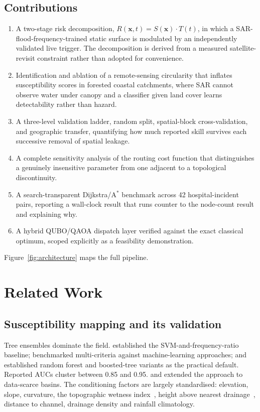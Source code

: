 \documentclass[journal]{IEEEtran}
\newcommand{\Sx}{S(\mathbf{x})}
\newcommand{\Tt}{T(t)}
\newcommand{\Rxt}{R(\mathbf{x},t)}
\begin{document}
\subsection{Contributions}
\begin{enumerate}
\itemsep2pt
\item A two-stage risk decomposition, $\Rxt=\Sx\cdot\Tt$, in which a
      SAR-flood-frequency-trained static surface is modulated by an independently
      validated live trigger. The decomposition is derived from a measured
      satellite-revisit constraint rather than adopted for convenience.
\item Identification and ablation of a remote-sensing circularity that inflates
      susceptibility scores in forested coastal catchments, where SAR cannot
      observe water under canopy and a classifier given land cover learns
      detectability rather than hazard.
\item A three-level validation ladder, random split, spatial-block
      cross-validation, and geographic transfer, quantifying how much reported
      skill survives each successive removal of spatial leakage.
\item A complete sensitivity analysis of the routing cost function that
      distinguishes a genuinely insensitive parameter from one adjacent to a
      topological discontinuity.
\item A search-transparent Dijkstra/A$^\ast$ benchmark across 42
      hospital-incident pairs, reporting a wall-clock result that runs counter to
      the node-count result and explaining why.
\item A hybrid QUBO/QAOA dispatch layer verified against the exact classical
      optimum, scoped explicitly as a feasibility demonstration.
\end{enumerate}

Figure~\ref{fig:architecture} maps the full pipeline.

\section{Related Work}
\label{sec:related}

\subsection{Susceptibility mapping and its validation}
Tree ensembles dominate the field. \citet{tehrany2014} established the
SVM-and-frequency-ratio baseline; \citet{khosravi2018} benchmarked multi-criteria
against machine-learning approaches; \citet{arabameri2019} and \citet{saha2021}
established random forest and boosted-tree variants as the practical default.
Reported AUCs cluster between 0.85 and 0.95. \citet{wang2020} and
\citet{avand2021} extended the approach to data-scarce basins.
The conditioning factors are largely standardised: elevation, slope, curvature,
the topographic wetness index~\citep{beven1979}, height above nearest
drainage~\citep{renno2008,nobre2011}, distance to channel, drainage density and
rainfall climatology.
\end{document}
